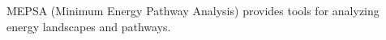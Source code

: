  	

MEPSA (Minimum Energy Pathway Analysis) \cite{Marcos_Alcalde_2015} provides tools for analyzing energy landscapes and pathways.